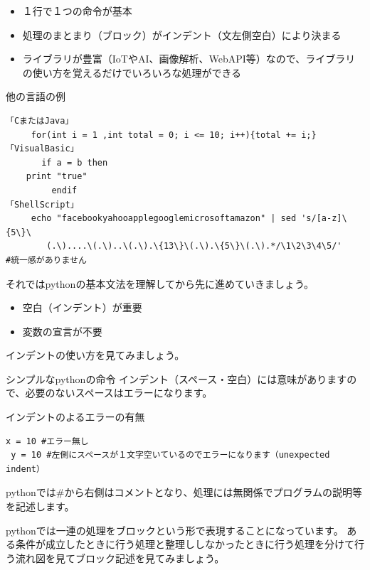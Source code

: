 \documentclass[11pt,a4paper,dvipdfmx,titlepage]{jsreport}
\begin{document}
\begin{itemize}
\item １行で１つの命令が基本
\item 処理のまとまり（ブロック）がインデント（文左側空白）により決まる
\item ライブラリが豊富（IoTやAI、画像解析、WebAPI等）なので、ライブラリの使い方を覚えるだけでいろいろな処理ができる
\end{itemize}

\begin{pabox}{他の言語の例}
\begin{verbatim}
「CまたはJava」
     for(int i = 1 ,int total = 0; i <= 10; i++){total += i;}
「VisualBasic」
       if a = b then
    print "true"
         endif
「ShellScript」
     echo "facebookyahooapplegooglemicrosoftamazon" | sed 's/[a-z]\{5\}\
        (.\)....\(.\)..\(.\).\{13\}\(.\).\{5\}\(.\).*/\1\2\3\4\5/'
#統一感がありません
\end{verbatim}
\end{pabox}

それではpythonの基本文法を理解してから先に進めていきましょう。

\begin{itemize}
\item 空白（インデント）が重要
\item 変数の宣言が不要
\end{itemize}
インデントの使い方を見てみましょう。
\begin{pabox}{シンプルなpythonの命令}
インデント（スペース・空白）には意味がありますので、必要のないスペースはエラーになります。
\begin{legbox}{インデントのよるエラーの有無}
\begin{verbatim}
x = 10 #エラー無し
 y = 10 #左側にスペースが１文字空いているのでエラーになります（unexpected indent）
\end{verbatim}
\end{legbox}
pythonでは\#から右側はコメントとなり、処理には無関係でプログラムの説明等を記述します。
\end{pabox}

pythonでは一連の処理をブロックという形で表現することになっています。
ある条件が成立したときに行う処理と整理ししなかったときに行う処理を分けて行う流れ図を見てブロック記述を見てみましょう。\\
\end{document}

